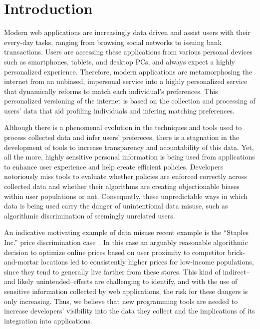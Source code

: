 
\section{Introduction}

Modern web applications are increasingly data driven and assist users
with their every-day tasks, ranging from browsing social networks to
issuing bank transactions. Users are accessing these applications from
various personal devices such as smartphones, tablets, and desktop PCs,
and always expect a highly personalized experience. Therefore, modern
applications are metamorphosing the internet from an unbiased, impersonal
service into a highly personalized service that dynamically reforms to match
each individual's preferences. This personalized versioning of the internet
is based on the collection and processing of users' data that aid profiling
individuals and infering matching preferences.

Although there is a phenomenal evolution in the techniques and tools used to
process collected data and infer users' prefereces, there is a stagnation
in the development of tools to increase transparency and acountability of
this data. Yet, all the more,  highly sensitive personal information is being
used from applications to enhance user experience and help create efficient
policies. Developers notoriously miss tools to evaluate whether policies are
enforced correctly across collected data and whether their algorithms are
creating objectionable biases within user populations or not. Consequntly,
these unpredictable ways in which data is being used carry the danger of
unintentional data misuse, such as algorithmic discrimination of seemingly
unrelated users.

An indicative motivating example of data misuse recent example is the ``Staples Inc.'' price discrimination
case~\cite{Staples}.
In this case an arguably reasonable algorithmic decision to optimize online
prices based on user proximity to competitor brick-and-mortar locations led to
consistently higher prices for low-income populations, since they tend to
generally live farther from these stores. This kind of indirect--and likely
unintended--effects are challenging to identify, and with the use of sensitive
information collected by web applications, the risk for these dangers is only
increasing. Thus, we believe that new programming tools are needed to increase
developers’ visibility into the data they collect and the implications of its
integration into applications.

